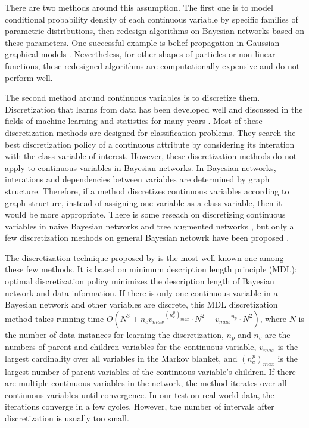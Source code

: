 There are two methods around this assumption. The first one is to model conditional probability density of each continuous variable by specific families of parametric distributions, then redesign algorithms on Bayesian networks based on these parameters. One successful example is belief propagation in Gaussian graphical models \citep{Weiss_2011}. Nevertheless, for other shapes of particles \citep{Ihler_2009} or non-linear functions, these redesigned algorithms are computationally expensive and do not perform well.

The second method around continuous variables is to discretize them. Discretization that learns from data has been developed well and discussed in the fields of machine learning and statistics for many years \citep{Dougherty_1995, Kerber_1992, Holte_1993, Fayyad_1993} . Most of these discretization methods are designed for classification problems. They search the best discretization policy of a continuous attribute by considering its interation with the class variable of interest. However, these discretization methods do not apply to continuous variables in Bayesian networks. In Bayesian networks, interations and dependencies between variables are determined by graph structure. Therefore, if a method discretizes continuous variables according to graph structure, instead of assigning one variable as a class variable, then it would be more appropriate. There is some reseach on discretizing continuous variables in naive Bayesian networks and tree augmented networks \citep{Fried_naive}, but only a few discretization methods on general Bayesian netowrk have been proposed \citep{Friedman_1996, Kozlov_1997, Monti_1998, Steck_2007}. 

The discretization technique proposed by \citet{Friedman_1996} is the most well-known one among these few methods. It is based on minimum description length principle (MDL): optimal discretization policy minimizes the description length of Bayesian network and data information. If there is only one continuous variable in a Bayesian network and other variables are discrete, this MDL discretization method takes running time $O(N^3 + n_c {v_{max}}^{(n_c^p)_{max}} \cdot N^2 + {v_{max}}^{n_p} \cdot N^2)$, where $N$ is the number of data instances for learning the discretization, $n_p$ and $n_c$ are the numbers of parent and children variables for the continuous variable, $v_{max}$ is the largest cardinality over all variables in the Markov blanket, and  ${(n_c^p)_{max}}$ is the largest number of parent variables of the continuous variable's children. If there are multiple continuous variables in the network, the method iterates over all continuous variables until convergence. In our test on real-world data, the iterations converge in a few cycles. However, the number of intervals after discretization is usually too small.

